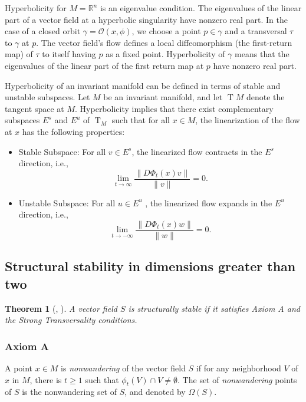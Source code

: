 \documentclass{article}
\newtheorem{theorem}{Theorem}
\theoremstyle{definition}
\theoremstyle{remark}
\newcommand{\reals}{\mathbb{R}}
\newcommand{\T}{\operatorname{T}}
\newcommand{\TM}{\T\!M}
\newcounter{ct}
\begin{document}
Hyperbolicity for $M=\reals^n$ is an eigenvalue condition.
The eigenvalues of the linear part of a vector field at a hyperbolic singularity have nonzero real part.
In the case of a closed orbit $\gamma=\mathcal{O}(x,\phi)$, we choose a point $p\in\gamma$ and a transversal $\tau$ to $\gamma$ at $p$.
The vector field's flow defines a local diffeomorphism (the first-return map) of $\tau$ to itself having $p$ as a fixed point.
Hyperbolicity of $\gamma$ means that the eigenvalues of the linear part of the first return map at $p$ have nonzero real part.
   
Hyperbolicity of an invariant manifold can be defined in terms of stable and unstable subspaces. Let $M$ be an invariant manifold, and let $\TM$  denote the tangent space at $M$. Hyperbolicity implies that there exist complementary subspaces $E^s$  and $E^u$  of $\T_M$  such that for all $x\in M$, the linearization of the flow at $x$ has the following properties:
\begin{itemize}
\item Stable Subspace: For all $v\in E^s$, the linearized flow contracts in the $E^s$  direction, i.e., \[\lim_{t \to \infty} \frac{\|D\Phi_t(x)v\|}{\|v\|} = 0.\]
\item Unstable Subspace: For all $u\in E^u$ , the linearized flow expands in the $E^u$ direction, i.e., \[\lim_{t \to -\infty} \frac{\|D\Phi_t(x)w\|}{\|w\|} = 0.\]
\end{itemize}




\subsection{Structural stability in dimensions greater than two}
\begin{theorem}[\cite{robbin1971ss}, \cite{robinson1974ss}]\label{theorem:ss}
A vector field $S$ is structurally stable if it satisfies Axiom A and the Strong Transversality conditions.
\end{theorem}

\subsubsection{Axiom A}
A point $x\in M$ is \emph{nonwandering} of the vector field $S$ if for any neighborhood $V$ of $x$ in $M$, there is $t\geq 1$ such that $\phi_t(V) \cap V\neq \emptyset$. The set of \emph{nonwandering} points of $S$ is the nonwandering set of $S$, and denoted by $\Omega(S)$. 
\end{document}
